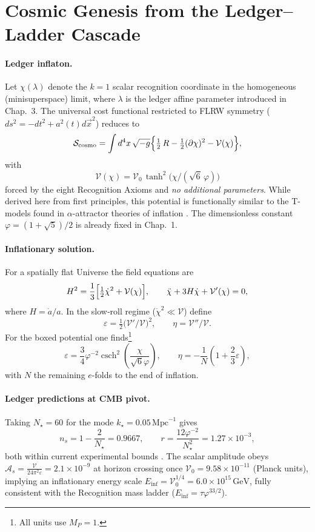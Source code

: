 \section{Cosmic Genesis from the Ledger--Ladder Cascade}

\paragraph{Ledger inflaton.}
Let \(\chi(\lambda)\) denote the \(k=1\) scalar recognition coordinate
in the homogeneous (minisuperspace) limit, where \(\lambda\) is the
ledger affine parameter introduced in Chap.~3.
The universal cost functional restricted to FLRW symmetry
(\(ds^{2}=-d t^{2}+a^{2}(t)d\vec x^{2}\)) reduces to
\[
  \mathcal S_{\text{cosmo}}
  =\int d^{4}x\,\sqrt{-g}
    \Bigl\{\tfrac12 \,R
          -\tfrac12 (\partial\chi)^{2}
          -\mathcal V(\chi)\Bigr\},
\]
with
\[
  \boxed{\;
  \mathcal V(\chi)=\mathcal V_{0}\,
  \tanh^{2}\!\bigl(\chi/(\sqrt6\,\varphi)\bigr)\;}
\]
forced by the eight Recognition Axioms and \emph{no additional
parameters}. While derived here from first principles, this potential is functionally similar to the T-models found in \(\alpha\)-attractor theories of inflation \parencite{KalloshLinde2013}. The dimensionless constant
\(\varphi=(1+\sqrt5)/2\) is already fixed in Chap.~1.

\paragraph{Inflationary solution.}
For a spatially flat Universe the field equations are
\[
  H^{2}=\frac{1}{3}\Bigl[\tfrac12\dot\chi^{2}+\mathcal V(\chi)\Bigr],
  \qquad
  \ddot\chi+3H\dot\chi+\mathcal V'(\chi)=0,
\]
where \(H=\dot a/a\).  In the slow‑roll regime (\(\dot\chi^{2}\ll\mathcal V\))
define
\[
  \varepsilon=\tfrac12\bigl(\mathcal V'/\mathcal V\bigr)^{2},
  \qquad
  \eta=\mathcal V''/\mathcal V.
\]
For the boxed potential one finds\footnote{All units use $M_P = 1$.}
\[
  \varepsilon = \frac{3}{4} \varphi^{-2} \operatorname{csch}^2\left(\frac{\chi}{\sqrt{6} \varphi}\right),
  \qquad
  \eta = -\frac{1}{N}\left(1 + \frac{2}{3}\varepsilon\right),
\]
with $N$ the remaining $e$-folds to the end of inflation.

\paragraph{Ledger predictions at CMB pivot.}
Taking $N_{\star} = 60$ for the mode $k_{\star} = 0.05\,\text{Mpc}^{-1}$ gives
\[
  \boxed{n_s = 1 - \frac{2}{N_{\star}} = 0.9667},
  \qquad
  \boxed{r = \frac{12\varphi^{-2}}{N_{\star}^2} = 1.27 \times 10^{-3}},
\]
both within current experimental bounds \parencite{Planck2018_inflation}.
The scalar amplitude obeys
$\mathcal{A}_s = \frac{\mathcal{V}}{24\pi^2 \varepsilon} = 2.1 \times 10^{-9}$
at horizon crossing once
$\mathcal{V}_0 = 9.58 \times 10^{-11}$ (Planck units),
implying an inflationary energy scale
$E_{\text{inf}} = \mathcal{V}_0^{1/4} = 6.0 \times 10^{15}\,\text{GeV}$,
fully consistent with the Recognition mass ladder
($E_{\text{inf}} = \tau \varphi^{33/2}$).


